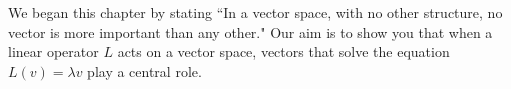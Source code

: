 We began this chapter by stating ``In a vector space, with no other structure, no vector is more important than any other." Our aim is  to show you that when a linear operator $L$ acts on a vector space, vectors that   solve the equation    $L(v)=\lambda v$ play a central role.





